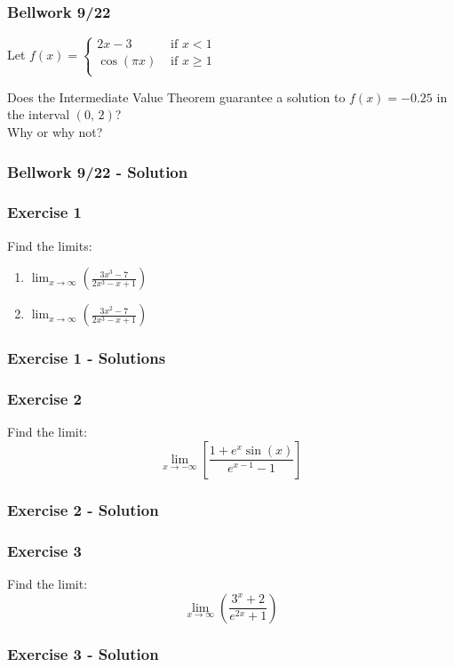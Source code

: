 \documentclass[12pt]{beamer}
\begin{document}
\begin{frame}
	\frametitle{Bellwork 9/22}

	\large
	\initclock
	\begin{center}
		Let $f(x) =
			\begin{cases}
				2x - 3      & \text{ if } x < 1    \\
				\cos(\pi x) & \text{ if } x \geq 1 \\
			\end{cases}$ \\
	\end{center}
	\vfill
	Does the Intermediate Value Theorem guarantee a solution to $f(x) = -0.25$ in the interval $(0\text{, } 2)$?\\
	\vfill
	Why or why not? \\
	\vfill
	\vfill
	\crono
\end{frame}
\begin{frame}
	\frametitle{Bellwork 9/22 - Solution}

\end{frame}
\begin{frame}
	\frametitle{Exercise 1}

	\Large
	Find the limits: \\
	\vfill
	\begin{enumerate}\itemsep4ex
		\item $\displaystyle\lim_{x\to\infty}\left(\frac{3x^3-7}{2x^3-x+1}\right)$
		\item $\displaystyle\lim_{x\to\infty}\left(\frac{3x^2-7}{2x^3-x+1}\right)$
	\end{enumerate}
\end{frame}
\begin{frame}
	\frametitle{Exercise 1 - Solutions}

\end{frame}
\begin{frame}
	\frametitle{Exercise 2}

	\Large
	Find the limit: \\
	\vfill
	\[\displaystyle\lim_{x\to-\infty}\left[\frac{1+e^x\sin(x)}{e^{x-1}-1}\right]\]
	\vfill
	\vfill
\end{frame}
\begin{frame}
	\frametitle{Exercise 2 - Solution}

\end{frame}
\begin{frame}
	\frametitle{Exercise 3}

	\Large
	Find the limit: \\
	\vfill
	\[\displaystyle\lim_{x\to\infty}\left(\frac{3^x+2}{e^{2x}+1}\right)\]
	\vfill
	\vfill
\end{frame}
\begin{frame}
	\frametitle{Exercise 3 - Solution}

\end{frame}
\end{document}
